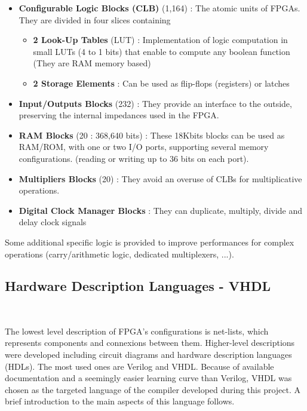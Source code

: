 \documentclass[10pt,a4paper]{article}
\renewcommand{\indent}{~\\\vspace{-.8cm}}
\begin{document}
\begin{itemize}
	\item \textbf{Configurable Logic Blocks (CLB)} (1,164) : The atomic units of FPGAs.
	They are divided in four slices  containing
	\begin{itemize}
		\item \textbf{2 Look-Up Tables} (LUT) : Implementation of logic computation in small LUTs (4 to 1 bits) that enable to compute any boolean function (They are RAM memory based)
		\item \textbf{2 Storage Elements} : Can be used as flip-flops (registers) or latches
	\end{itemize}
	\item \textbf{Input/Outputs Blocks} (232) : They provide an interface to the outside, preserving the internal impedances used in the FPGA.
\end{itemize}

\begin{itemize}
	\item \textbf{RAM Blocks} (20 : 368,640 bits) : These 18Kbits blocks can be used as RAM/ROM, with one or two I/O ports, supporting several memory configurations. (reading or writing up to 36 bits on each port).
	\item \textbf{Multipliers Blocks} (20) : They avoid an overuse of CLBs for multiplicative operations.
	\item \textbf{Digital Clock Manager Blocks} : They can duplicate, multiply, divide and delay clock signals
\end{itemize}

Some additional specific logic is provided to improve performances for complex operations (carry/arithmetic logic, dedicated multiplexers, ...).




\subsection{Hardware Description Languages - VHDL}
\indent

The lowest level description of FPGA's configurations is net-lists, which represents components and connexions between them. Higher-level descriptions were developed including circuit diagrams and hardware description languages (HDLs). The most used ones are Verilog and VHDL. Because of available documentation and a seemingly easier learning curve than Verilog, VHDL was chosen as the targeted language of the compiler developed during this project. A brief introduction to the main aspects of this language follows\cite{FRV}.
\end{document}
